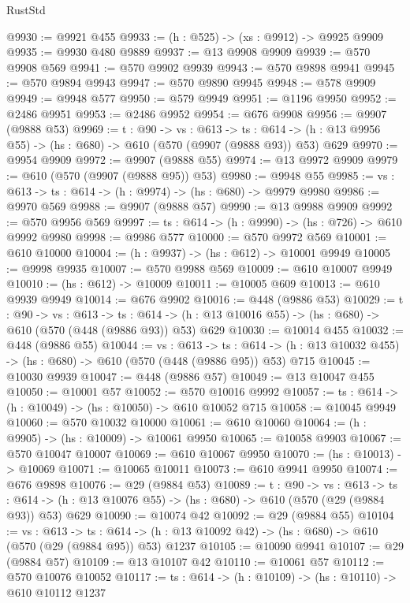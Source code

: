 \begin{lexlean}{RustStd}
\begin{coremodule}
@9930 := @9921 @455
@9933 := (h : @525) -> (xs : @9912) -> @9925 @9909
@9935 := @9930 @480 @9889
@9937 := @13 @9908 @9909
@9939 := @570 @9908 @569
@9941 := @570 @9902 @9939
@9943 := @570 @9898 @9941
@9945 := @570 @9894 @9943
@9947 := @570 @9890 @9945
@9948 := @578 @9909
@9949 := @9948 @577
@9950 := @579 @9949
@9951 := @1196 @9950
@9952 := @2486 @9951
@9953 := @2486 @9952
@9954 := @676 @9908
@9956 := @9907 (@9888 @53)
@9969 := {t : @90} ->
  {vs : @613} ->
  {ts : @614} -> (h : @13 @9956 @55) -> (hs : @680) -> @610 (@570 (@9907 (@9888 @93)) @53) @629
@9970 := @9954 @9909
@9972 := @9907 (@9888 @55)
@9974 := @13 @9972 @9909
@9979 := @610 (@570 (@9907 (@9888 @95)) @53)
@9980 := @9948 @55
@9985 := {vs : @613} -> {ts : @614} -> (h : @9974) -> (hs : @680) -> @9979 @9980
@9986 := @9970 @569
@9988 := @9907 (@9888 @57)
@9990 := @13 @9988 @9909
@9992 := @570 @9956 @569
@9997 := {ts : @614} -> (h : @9990) -> (hs : @726) -> @610 @9992 @9980
@9998 := @9986 @577
@10000 := @570 @9972 @569
@10001 := @610 @10000
@10004 := (h : @9937) -> (hs : @612) -> @10001 @9949
@10005 := @9998 @9935
@10007 := @570 @9988 @569
@10009 := @610 @10007 @9949
@10010 := (hs : @612) -> @10009
@10011 := @10005 @609
@10013 := @610 @9939 @9949
@10014 := @676 @9902
@10016 := @448 (@9886 @53)
@10029 := {t : @90} ->
  {vs : @613} ->
  {ts : @614} -> (h : @13 @10016 @55) -> (hs : @680) -> @610 (@570 (@448 (@9886 @93)) @53) @629
@10030 := @10014 @455
@10032 := @448 (@9886 @55)
@10044 := {vs : @613} ->
  {ts : @614} -> (h : @13 @10032 @455) -> (hs : @680) -> @610 (@570 (@448 (@9886 @95)) @53) @715
@10045 := @10030 @9939
@10047 := @448 (@9886 @57)
@10049 := @13 @10047 @455
@10050 := @10001 @57
@10052 := @570 @10016 @9992
@10057 := {ts : @614} -> (h : @10049) -> (hs : @10050) -> @610 @10052 @715
@10058 := @10045 @9949
@10060 := @570 @10032 @10000
@10061 := @610 @10060
@10064 := (h : @9905) -> (hs : @10009) -> @10061 @9950
@10065 := @10058 @9903
@10067 := @570 @10047 @10007
@10069 := @610 @10067 @9950
@10070 := (hs : @10013) -> @10069
@10071 := @10065 @10011
@10073 := @610 @9941 @9950
@10074 := @676 @9898
@10076 := @29 (@9884 @53)
@10089 := {t : @90} ->
  {vs : @613} ->
  {ts : @614} -> (h : @13 @10076 @55) -> (hs : @680) -> @610 (@570 (@29 (@9884 @93)) @53) @629
@10090 := @10074 @42
@10092 := @29 (@9884 @55)
@10104 := {vs : @613} ->
  {ts : @614} -> (h : @13 @10092 @42) -> (hs : @680) -> @610 (@570 (@29 (@9884 @95)) @53) @1237
@10105 := @10090 @9941
@10107 := @29 (@9884 @57)
@10109 := @13 @10107 @42
@10110 := @10061 @57
@10112 := @570 @10076 @10052
@10117 := {ts : @614} -> (h : @10109) -> (hs : @10110) -> @610 @10112 @1237

\end{coremodule}
\end{lexlean}
